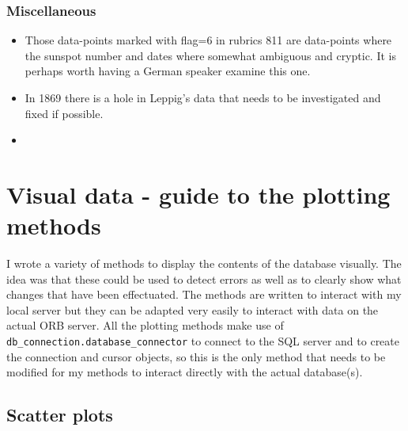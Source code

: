 \documentclass[12pt]{article}
\begin{document}
\subsubsection{Miscellaneous}
\begin{itemize}
    \item Those data-points marked with flag=6 in rubrics 811 are data-points where the sunspot number and dates where somewhat ambiguous and cryptic. It is perhaps worth having a German speaker examine this one.
    \item In 1869 there is a hole in Leppig's data that needs to be investigated and fixed if possible.
    \item 
\end{itemize}


\section{Visual data - guide to the plotting methods}\label{section:plots and graphs explain}
I wrote a variety of methods to display the contents of the database visually. The idea was that these could be used to detect errors as well as to clearly show what changes that have been effectuated. The methods are written to interact with my local server but they can be adapted very easily to interact with data on the actual ORB server. All the plotting methods make use of \texttt{db\_connection.database\_connector} to connect to the SQL server and to create the connection and cursor objects, so this is the only method that needs to be modified for my methods to interact directly with the actual database(s). 

\subsection{Scatter plots}
\end{document}
